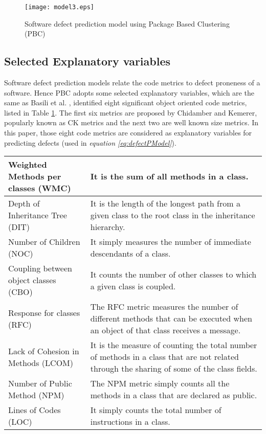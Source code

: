 \documentclass[12pt]{report}
\begin{document}
\begin{figure}[h!]
\center
      \texttt{[image: model3.eps]}
		\caption{Software defect prediction model using Package Based Clustering (PBC)}
		\label{defectPModel}	
\end{figure}



\subsection{Selected Explanatory variables}

Software defect prediction models relate the code metrics to defect proneness of a software. Hence PBC adopts some selected explanatory variables, which are the same as Basili et al. \cite{basili1996validation,di2011genetic}, identified eight significant object oriented code metrics, listed in Table \ref{defectPModel}. The first six metrics are proposed by Chidamber and Kemerer, popularly known as CK metrics \cite{chidamber1994metrics} and the next two are well known size metrics. In this paper, those eight code metrics are considered as explanatory variables for predicting defects (used in \textit{equation \ref{eq:defectPModel}}).

\begin{center}

\label{ExplanatoryVariable}
    \begin{tabular}{| p{6cm}  |p{9cm}|}
    \hline
    Weighted Methods per classes (WMC) & It is the sum of all methods in a class. \\ \hline
    Depth of Inheritance Tree (DIT) &  It is the length of the longest path from a given class to the root class in the inheritance hierarchy. \\ \hline
    Number of Children (NOC)  & It simply measures the number of immediate descendants of a class. \\ \hline
    Coupling between object classes (CBO) & It counts the number of other classes to which a given class is coupled. \\
    \hline
		Response for classes (RFC) & The RFC metric measures the number of different methods that can be executed when an object of that class receives a message.\\ \hline
		Lack of Cohesion in Methods (LCOM) & It is the measure of counting the total number of methods in a class that are not related through the sharing of some of the class fields.\\ \hline
		Number of Public Method (NPM) & The NPM metric simply counts all the methods in a class that are declared as public.\\ \hline
		Lines of Codes (LOC)& It simply counts the total number of instructions in a class. \\ \hline 
    \end{tabular}
	\end{center}
\end{document}
